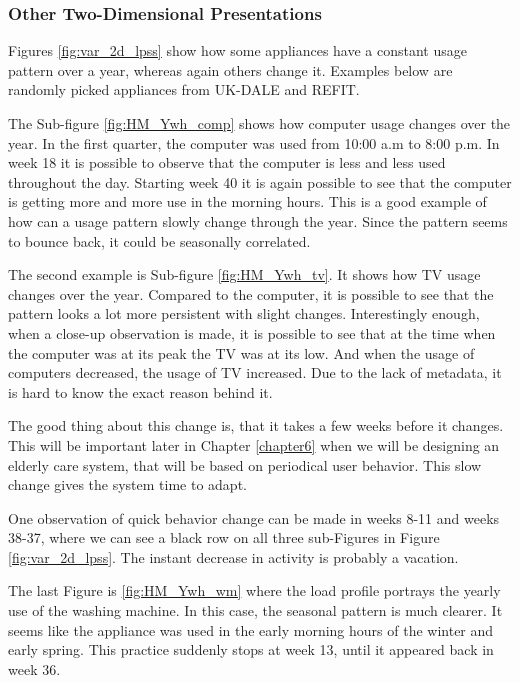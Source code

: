 \subsubsection{Other Two-Dimensional Presentations}

Figures \ref{fig:var_2d_lpss} show how some appliances have a constant usage pattern over a year, whereas again others change it. 
Examples below are randomly picked appliances from UK-DALE and REFIT. 

The Sub-figure \ref{fig:HM_Ywh_comp} shows how computer usage changes over the year.
In the first quarter, the computer was used from 10:00 a.m to 8:00 p.m.
In week 18 it is possible to observe that the computer is less and less used throughout the day. 
Starting week 40 it is again possible to see that the computer is getting more and more use in the morning hours. 
This is a good example of how can a usage pattern slowly change through the year. 
Since the pattern seems to bounce back, it could be seasonally correlated. 

The second example is Sub-figure \ref{fig:HM_Ywh_tv}. It shows how TV usage changes over the year.
Compared to the computer, it is possible to see that the pattern looks a lot more persistent with slight changes.
Interestingly enough, when a close-up observation is made, it is possible to see that at the time when the computer was at its peak
the TV was at its low. And when the usage of computers decreased, the usage of TV increased. 
Due to the lack of metadata, it is hard to know the exact reason behind it. 

The good thing about this change is, that it takes a few weeks before it changes. 
This will be important later in Chapter \ref{chapter6} when we will be designing an elderly care system, that will be based on periodical user behavior.
This slow change gives the system time to adapt. 

One observation of quick behavior change can be made in weeks 8-11 and weeks 38-37, where we can see a black row on all three sub-Figures in Figure \ref{fig:var_2d_lpss}.
The instant decrease in activity is probably a vacation.

The last Figure is \ref{fig:HM_Ywh_wm} where the load profile portrays the yearly use of the washing machine.
In this case, the seasonal pattern is much clearer. 
It seems like the appliance was used in the early morning hours of the winter and early spring.
This practice suddenly stops at week 13, until it appeared back in week 36.


